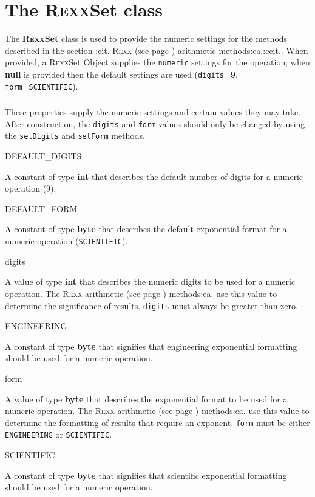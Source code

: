 \chapter{The R\textsc{exx}Set class}\label{refnlrset}
 
The \textbf{R\textsc{exx}Set} class is used to provide the numeric settings for
the methods described in the section :cit. R\textsc{exx} (see page \pageref{refrexxops}) 
arithmetic methods:ea.:ecit..
When provided, a R\textsc{exx}Set Object supplies the \texttt{numeric} settings
for the operation; when \textbf{null} is provided then the default
settings are used (\texttt{digits}=\textbf{9},
\texttt{form}=\texttt{SCIENTIFIC}).
\subsection{}\label{}
 
These properties supply the numeric settings and certain values they may
take.  After construction, the \texttt{digits} and \texttt{form} values
should only be changed by using the \texttt{setDigits} and
\texttt{setForm} methods.
\begin{description}
\item{DEFAULT\_DIGITS}

A constant of type \textbf{int} that describes the default number of
digits for a numeric operation (9).
\item{DEFAULT\_FORM}

A constant of type \textbf{byte} that describes the default exponential
format for a numeric operation (\texttt{SCIENTIFIC}).
\item{digits}

A value of type \textbf{int} that describes the numeric digits to be
used for a numeric operation.  The  R\textsc{exx} arithmetic (see page \pageref{refrexxops}) 
methods:ea. use this value to determine the significance of results.
\texttt{digits} must always be greater than zero.
\item{ENGINEERING}

A constant of type \textbf{byte} that signifies that engineering
exponential formatting should be used for a numeric operation.
\item{form}

A value of type \textbf{byte} that describes the exponential format to
be used for a numeric operation.  The  R\textsc{exx} arithmetic (see page \pageref{refrexxops}) 
methods:ea. use this value to determine the formatting of results that
require an exponent.
\texttt{form} must be either \texttt{ENGINEERING} or \texttt{SCIENTIFIC}.
\item{SCIENTIFIC}

A constant of type \textbf{byte} that signifies that scientific
exponential formatting should be used for a numeric operation.
\end{description}
